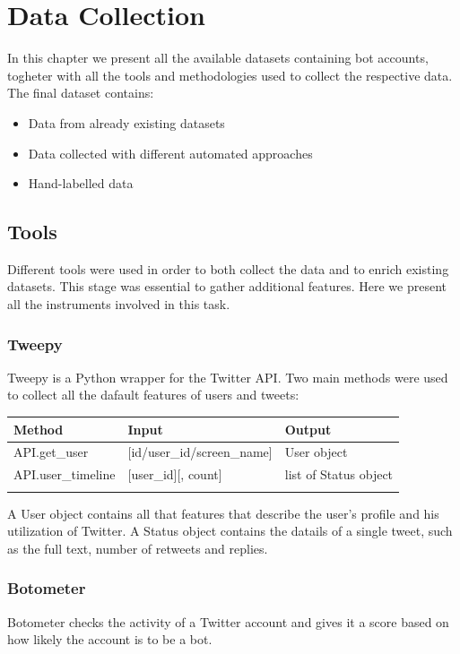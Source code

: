 
\chapter{Data Collection}
\label{capitolo3}
\thispagestyle{empty}


In this chapter we present all the available datasets containing bot accounts, togheter with all the tools and methodologies used to collect the respective data. The final dataset contains:

\begin{itemize}
\item[\PencilRight]Data from already existing datasets
\item[\PencilRight]Data collected with different automated approaches
\item[\PencilRight]Hand-labelled data
\end{itemize}

\section{Tools}
Different tools were used in order to both collect the data and to enrich existing datasets. This stage was essential to gather additional features. Here we present all the instruments involved in this task.

\subsection{Tweepy}
Tweepy is a Python wrapper for the Twitter API.
Two main methods were used to collect all the dafault features of users and tweets:\\


\begin{tabular}{lll}
\centering	
	Method&Input&Output\\ \hline\hline
	API.get\_user&[id/user\_id/screen\_name]&User object\\
	API.user\_timeline&[user\_id][, count]&list of Status object\\ \hline\\
\end{tabular}

A User object contains all that features that describe the user's profile and his utilization of Twitter.
A Status object contains the datails of a single tweet, such as the full text, number of retweets and replies.

\subsection{Botometer}
Botometer \cite{Botometer} checks the activity of a Twitter account and gives it a score based on how likely the account is to be a bot.

